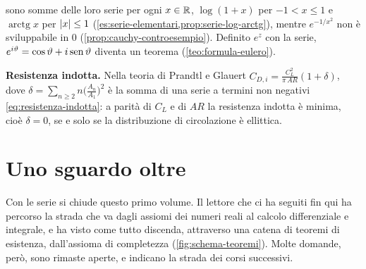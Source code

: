 \begin{puntichiave}
sono somme delle loro serie per ogni $x\in\mathbb{R}$, $\log(1+x)$ per $-1<x\le1$ e
$\operatorname{arctg}x$ per $\lvert x\rvert\le1$ (\cref{es:serie-elementari,prop:serie-log-arctg}), mentre
$e^{-1/x^{2}}$ non è sviluppabile in $0$ (\cref{prop:cauchy-controesempio}). Definito $e^{z}$
con la serie, $e^{i\vartheta}=\cos\vartheta+i\operatorname{sen}\vartheta$ diventa un teorema (\cref{teo:formula-eulero}).
\item \textbf{Resistenza indotta.} Nella teoria di Prandtl e Glauert
$C_{D,i}=\frac{C_{L}^{2}}{\pi\,AR}(1+\delta)$, dove $\delta=\sum_{n\ge2}n\bigl(\frac{A_{n}}{A_{1}}\bigr)^{2}$ è la
somma di una serie a termini non negativi \eqref{eq:resistenza-indotta}: a parità di
$C_{L}$ e di $AR$ la resistenza indotta è minima, cioè $\delta=0$, se e solo se la
distribuzione di circolazione è ellittica.
\end{puntichiave}

\section*{Uno sguardo oltre}

Con le serie si chiude questo primo volume. Il lettore che ci ha seguiti fin qui ha
percorso la strada che va dagli assiomi dei numeri reali al calcolo differenziale e
integrale, e ha visto come tutto discenda, attraverso una catena di teoremi di
esistenza, dall'assioma di completezza (\cref{fig:schema-teoremi}). Molte domande, però,
sono rimaste aperte, e indicano la strada dei corsi successivi.


